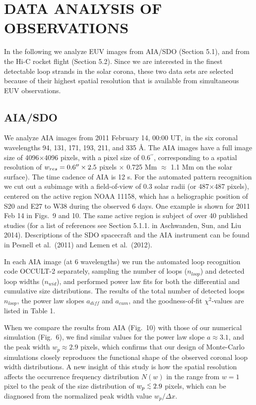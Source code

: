 \documentclass[10pt,preprint]{aastex}  %
\def\ang{\AA}
\def\arcsec{\hbox{$^{\prime\prime}$}}
\def\lapprox{\lower.4ex\hbox{$\;\buildrel <\over{\scriptstyle\sim}\;$}}
\begin{document}
\section{	DATA ANALYSIS OF OBSERVATIONS			}

In the following we analyze EUV images from AIA/SDO (Section 5.1),
and from the Hi-C rocket flight (Section 5.2). 
Since we are interested in the finest detectable loop strands in the 
solar corona, these two data sets are selected because of their 
highest spatial resolution that is available from simultaneous
EUV observations.

\subsection{	AIA/SDO					}

We analyze AIA images from 2011 February 14, 00:00 UT,
in the six coronal wavelengths 94, 131, 171, 
193, 211, and 335 \ang . The AIA images have a full image size
of 4096$\times$4096 pixels, with a pixel size of 0.6\arcsec,
corresponding to a spatial resolution of $w_{res}=0.6\arcsec
\times 2.5$ pixels $\times$ 0.725 Mm $\approx$ 1.1 Mm 
on the solar surface).  The time cadence
of AIA is 12 s. For the automated pattern recognition we cut out
a subimage with a field-of-view of 0.3 solar radii (or
487$\times$487 pixels), centered on
the active region NOAA 11158, which has a heliographic position
of S20 and E27 to W38 during the observed 6 days. One example
is shown for 2011 Feb 14 in Figs.~9 and 10. The same active region is
subject of over 40 published studies (for a list of references
see Section 5.1.1. in Aschwanden, Sun, and Liu 2014). 
Descriptions of the SDO spacecraft and the AIA instrument can 
be found in Pesnell et al.~(2011) and Lemen et al.~(2012).  

In each AIA image (at 6 wavelengths) we run the 
automated loop recognition code OCCULT-2 separately, sampling 
the number of loops ($n_{loop}$) and detected loop widths ($n_{wid}$),
and performed power law fits for both the differential and
cumulative size distributions. The results of the
total number of detected loops $n_{loop}$, the power law
slopes $a_{diff}$ and $a_{cum}$, and the goodness-of-fit 
$\chi^2$-values are listed in Table 1.

When we compare the results from AIA (Fig.~10) with those of
our numerical simulation (Fig.~6), we find similar values for
the power law slope $a \approx 3.1$, and the peak width 
$w_p \approx 2.9$ pixels, which confirms that our design
of Monte-Carlo simulations closely reproduces the functional 
shape of the observed coronal loop width distributions. A new insight 
of this study is how the spatial resolution affects the 
occurrence frequency distribution $N(w)$ in the range from $w=1$ pixel
to the peak of the size distribution of $w_p \lapprox 2.9$ pixels,
which can be diagnosed from the normalized peak width value
$w_p/\Delta x$.
\end{document}
